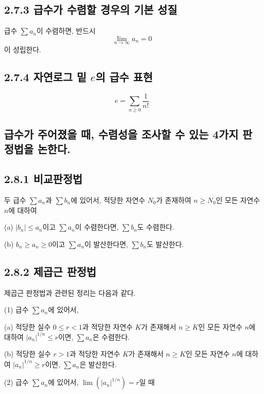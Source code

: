 \documentclass{article}
\begin{document}
\subsection*{\textmd{2.7.3 급수가 수렴할 경우의 기본 성질}}
급수 \( \sum a_n \)이 수렴하면, 반드시
\[
\lim_{n \to \infty} a_n = 0
\]
이 성립한다.

\subsection*{\textmd{2.7.4 자연로그 밑 \( e \)의 급수 표현}}
\[
e = \sum_{n \geq 0} \frac{1}{n!}
\]

\subsection{\fontsize{11.5}{13}\selectfont 
급수가 주어졌을 때, 수렴성을 조사할 수 있는 4가지 판정법을 논한다.}

\subsection*{\textmd{2.8.1 비교판정법}}

두 급수 \( \sum a_n \)과 \( \sum b_n \)에 있어서, 적당한 자연수 \( N_0 \)가 존재하여 \( n \geq N_0 \)인 모든 자연수 \( n \)에 대하여

(a) \( \left| b_n \right| \leq a_n \)이고 \( \sum a_n \)이 수렴한다면, \( \sum b_n \)도 수렴한다.

(b) \( b_n \geq a_n \geq 0 \)이고 \( \sum a_n \)이 발산한다면, \( \sum b_n \)도 발산한다.

\subsection*{\textmd{2.8.2 제곱근 판정법}}

제곱근 판정법과 관련된 정리는 다음과 같다.

(1) 급수 \( \sum a_n \)에 있어서,

(a) 적당한 실수 \( 0 \leq r < 1 \)과 적당한 자연수 \( K \)가 존재해서 \( n \geq K \)인 모든 자연수 \( n \)에 대하여 \( \left| a_n \right|^{1/n} \leq r \)이면, \( \sum a_n \)은 수렴한다.

(b) 적당한 실수 \( r > 1 \)과 적당한 자연수 \( K \)가 존재해서 \( n \geq K \)인 모든 자연수 \( n \)에 대하여 \( \left| a_n \right|^{1/n} \geq r \)이면, \( \sum a_n \)은 발산한다.

(2) 급수 \( \sum a_n \)에 있어서, \( \lim \left( \left| a_n \right|^{1/n} \right) = r \)일 때
\end{document}
